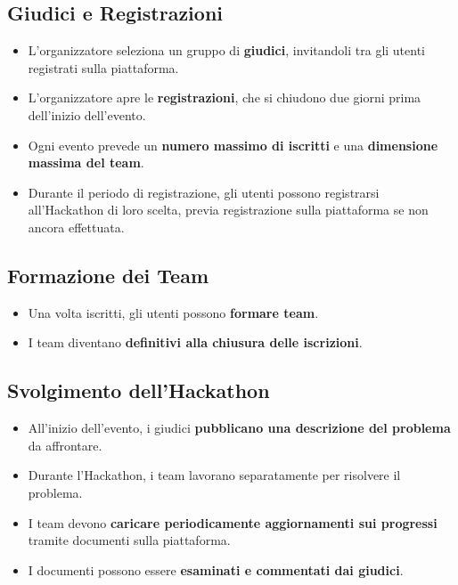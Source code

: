 \documentclass[a4paper, 10pt]{article}
\begin{document}
	\subsection*{Giudici e Registrazioni}
	
	\begin{itemize}
		\item L'organizzatore seleziona un gruppo di \textbf{giudici}, invitandoli tra gli utenti registrati sulla piattaforma.
		\item L'organizzatore apre le \textbf{registrazioni}, che si chiudono due giorni prima dell'inizio dell'evento.
		\item Ogni evento prevede un \textbf{numero massimo di iscritti} e una \textbf{dimensione massima del team}.
		\item Durante il periodo di registrazione, gli utenti possono registrarsi all'Hackathon di loro scelta, previa registrazione sulla piattaforma se non ancora effettuata.
	\end{itemize}
	
	\subsection*{Formazione dei Team}
	
	\begin{itemize}
		\item Una volta iscritti, gli utenti possono \textbf{formare team}.
		\item I team diventano \textbf{definitivi alla chiusura delle iscrizioni}.
	\end{itemize}
	
	\subsection*{Svolgimento dell'Hackathon}
	
	\begin{itemize}
		\item All'inizio dell'evento, i giudici \textbf{pubblicano una descrizione del problema} da affrontare.
		\item Durante l’Hackathon, i team lavorano separatamente per risolvere il problema.
		\item I team devono \textbf{caricare periodicamente aggiornamenti sui progressi} tramite documenti sulla piattaforma.
		\item I documenti possono essere \textbf{esaminati e commentati dai giudici}.
	\end{itemize}
	
\end{document}

